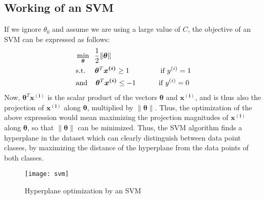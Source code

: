\documentclass[a4paper, 12pt]{article}
\begin{document}
\subsection{Working of an SVM}
If we ignore $\theta_0$ and assume we are using a large value of $C$, the objective of an SVM can be expressed as follows:
\begin{align*}
&\min_{\bm{\theta}} \hspace{2mm} \dfrac{1}{2}\lVert\bm{\theta}\rVert \\
&\text{s.t. } \hspace{3mm} \bm{\theta}^T\bm{x^{\left(i\right)}} \geq 1 \hspace{1.4cm} \text{ if } y^{\left(i\right)} = 1 \\
&\text{and} \hspace{4mm} \bm{\theta}^T\bm{x^{\left(i\right)}} \leq -1 \hspace{1cm} \text{ if } y^{\left(i\right)} = 0
\end{align*}
Now, $\bm{\theta}^T\bm{x^{\left(i\right)}}$ is the scalar product of the vectors $\bm{\theta}$ and $\bm{x^{\left(i\right)}}$, and is thus also the projection of $\bm{x^{\left(i\right)}}$ along $\bm{\theta}$, multiplied by $\lVert\bm{\theta}\rVert$. Thus, the optimization of the above expression would mean maximizing the projection magnitudes of $\bm{x^{\left(i\right)}}$ along $\bm{\theta}$, so that $\lVert\bm{\theta}\rVert$ can be minimized. Thus, the SVM algorithm finds a hyperplane in the dataset which can clearly distinguish between data point classes, by maximizing the distance of the hyperplane from the data points of both classes.
\begin{figure}[H]
\centering
\texttt{[image: svm]}
\caption{Hyperplane optimization by an SVM}
\end{figure}
\end{document}
